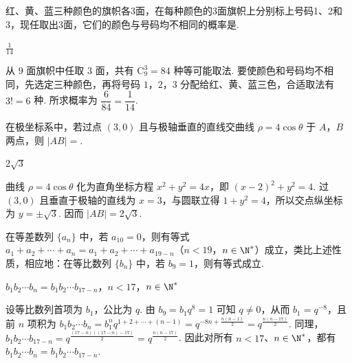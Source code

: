 \begin{problem}
红、黄、蓝三种颜色的旗帜各3面，在每种颜色的3面旗帜上分别标上号码1、2和3，现任取出3面，它们的颜色与号码均不相同的概率是\fillinblank{}.
\end{problem}

\begin{answer}
\(\frac{1}{14}\)
\end{answer}

\begin{solution}
从 \(9\) 面旗帜中任取 \(3\) 面，共有 \(\mathrm C_{9}^{3}=84\) 种等可能取法. 要使颜色和号码均不相同，先选定三种颜色，再将号码 \(1\)，\(2\)，\(3\) 分配给红、黄、蓝三色，合适取法有 \(3!=6\) 种. 所求概率为 \(\dfrac{6}{84}=\dfrac{1}{14}\).
\end{solution}

\begin{problem}
在极坐标系中，若过点 \((3,0)\) 且与极轴垂直的直线交曲线 \(\rho = 4\cos \theta\) 于 \(A\)，\(B\) 两点，则 \(|AB| =\)\fillinblank{}.
\end{problem}

\begin{answer}
\(2\sqrt{3}\)
\end{answer}

\begin{solution}
曲线 \(\rho=4\cos\theta\) 化为直角坐标方程 \(x^2+y^2=4x\)，即 \((x-2)^2+y^2=4\). 过 \((3,0)\) 且垂直于极轴的直线为 \(x=3\)，与圆联立得 \(1+y^2=4\)，所以交点纵坐标为 \(y=\pm\sqrt{3}\). 因而 \(|AB|=2\sqrt{3}\).
\end{solution}

\begin{problem}
在等差数列 \(\{a_{n}\}\) 中，若 \(a_{10} = 0\)，则有等式 \(a_{1} + a_{2} + \cdots + a_{n} = a_{1} + a_{2} + \cdots + a_{19-n}\)（\(n < 19\)，\(n \in \N^*\)）成立，类比上述性质，相应地：在等比数列 \(\{b_{n}\}\) 中，若 \(b_{9} = 1\)，则有等式\fillinblank{}成立.
\end{problem}

\begin{answer}
\(b_{1}b_{2}\cdots b_{n}=b_{1}b_{2}\cdots b_{17-n}\)，\(n<17\)，\(n\in\N^*\)
\end{answer}

\begin{solution}
设等比数列首项为 \(b_1\)，公比为 \(q\). 由 \(b_9=b_1q^8=1\) 可知 \(q\neq0\)，从而
\(b_1=q^{-8}\)，且前 \(n\) 项积为 \(b_1b_2\cdots b_n=b_1^nq^{1+2+\cdots+(n-1)}=q^{-8n+\frac{n(n-1)}{2}}=q^{\frac{n(n-17)}{2}}\). 同理，\(b_1b_2\cdots b_{17-n}=q^{\frac{(17-n)((17-n)-17)}{2}}=q^{\frac{n(n-17)}{2}}\). 因此对所有 \(n<17\)、\(n\in\N^*\)，都有 \(b_1b_2\cdots b_n=b_1b_2\cdots b_{17-n}\).
\end{solution}

